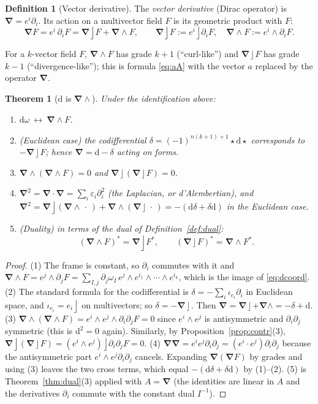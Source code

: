 \documentclass[11pt,a4paper]{article}
\newcounter{thm}[section]
\numberwithin{equation}{section}
\theoremstyle{definition}
\newtheorem{definition}[thm]{Definition}
\theoremstyle{plain}
\newtheorem{theorem}[thm]{Theorem}
\newcommand{\dd}{\mathrm{d}}
\newcommand{\lc}{\mathbin{\rfloor}}
\newcommand{\pss}{I}
\newcommand{\dual}[1]{#1^{\ast}}
\newcommand{\hodge}{\star}
\newcommand{\codiff}{\delta}
\newcommand{\vd}{\boldsymbol{\nabla}}               %
\begin{document}
\begin{definition}[Vector derivative]
The \emph{vector derivative} (Dirac operator) is $\vd=e^i\partial_i$. Its action on a multivector field $F$ is its geometric product with $F$:
\[
 \vd F=e^i\,\partial_iF=\vd\lc F+\vd\wedge F,\qquad \vd\lc F:=e^i\lc\partial_iF,\quad \vd\wedge F:=e^i\wedge\partial_iF .
\]
\end{definition}

For a $k$-vector field $F$, $\vd\wedge F$ has grade $k+1$ (``curl-like'') and $\vd\lc F$ has grade $k-1$ (``divergence-like''); this is formula \eqref{eq:aA} with the vector $a$ replaced by the operator $\vd$.

\begin{theorem}[$\dd$ is $\vd\wedge$]\label{thm:dGA}
Under the identification above:
\begin{enumerate}
  \item $\dd\omega\ \longleftrightarrow\ \vd\wedge F$.
  \item (Euclidean case) the codifferential $\codiff=(-1)^{n(k+1)+1}\hodge\dd\hodge$ corresponds to $-\vd\lc F$; hence $\vd=\dd-\codiff$ acting on forms.
  \item $\vd\wedge(\vd\wedge F)=0$ and $\vd\lc(\vd\lc F)=0$.
  \item $\vd^2=\vd\cdot\vd=\sum_i\varepsilon_i\partial_i^2$ (the Laplacian, or d'Alembertian), and $\vd^2=\vd\lc(\vd\wedge\,\cdot\,)+\vd\wedge(\vd\lc\,\cdot\,)=-(\dd\codiff+\codiff\dd)$ in the Euclidean case.
  \item (Duality) in terms of the dual of Definition~\ref{def:dual}:
  \[
   \dual{(\vd\wedge F)}=\vd\lc\dual F,\qquad \dual{(\vd\lc F)}=\vd\wedge\dual F .
  \]
\end{enumerate}
\end{theorem}
\begin{proof}
(1) The frame is constant, so $\partial_i$ commutes with it and
$\vd\wedge F=e^j\wedge\partial_jF=\sum_{I,j}\partial_j\omega_I\,e^j\wedge e^{i_1}\wedge\cdots\wedge e^{i_k}$, which is the image of \eqref{eq:dcoord}.
(2) The standard formula for the codifferential is $\codiff=-\sum_i\iota_{e_i}\partial_{i}$ in Euclidean space, and $\iota_{e_i}=e_i\lc$ on multivectors; so $\codiff=-\vd\lc$. Then $\vd=\vd\lc+\vd\wedge=-\codiff+\dd$.
(3) $\vd\wedge(\vd\wedge F)=e^i\wedge e^j\wedge\partial_i\partial_jF=0$ since $e^i\wedge e^j$ is antisymmetric and $\partial_i\partial_j$ symmetric (this is $\dd^2=0$ again). Similarly, by Proposition~\ref{prop:contr}(3), $\vd\lc(\vd\lc F)=(e^i\wedge e^j)\lc\partial_i\partial_jF=0$.
(4) $\vd\vd=e^ie^j\partial_i\partial_j=(e^i\cdot e^j)\partial_i\partial_j$ because the antisymmetric part $e^i\wedge e^j\partial_i\partial_j$ cancels. Expanding $\vd(\vd F)$ by grades and using (3) leaves the two cross terms, which equal $-(\dd\codiff+\codiff\dd)$ by (1)--(2).
(5) is Theorem~\ref{thm:dual}(3) applied with $A=\vd$ (the identities are linear in $A$ and the derivatives $\partial_i$ commute with the constant dual $\pss^{-1}$).
\end{proof}
\end{document}
